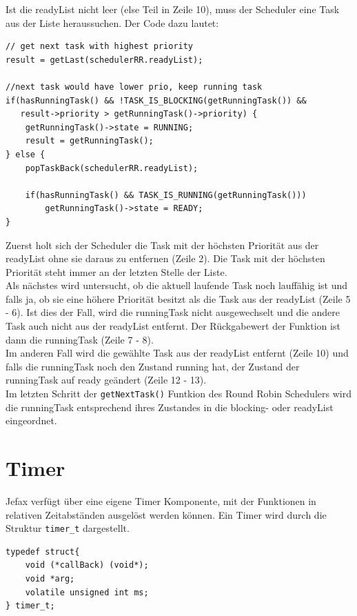 \documentclass[fontsize=12pt, toc=bibliography, notitlepage]{scrreprt}
\begin{document}
Ist die readyList nicht leer (else Teil in Zeile 10), muss der Scheduler eine Task aus der Liste heraussuchen. Der Code dazu lautet:

\begin{lstlisting}[title=schedulerRR.c]
// get next task with highest priority
result = getLast(schedulerRR.readyList);

//next task would have lower prio, keep running task
if(hasRunningTask() && !TASK_IS_BLOCKING(getRunningTask()) &&
   result->priority > getRunningTask()->priority) {
	getRunningTask()->state = RUNNING;
	result = getRunningTask();
} else {
	popTaskBack(schedulerRR.readyList);
	
	if(hasRunningTask() && TASK_IS_RUNNING(getRunningTask()))
		getRunningTask()->state = READY;
}
\end{lstlisting}

Zuerst holt sich der Scheduler die Task mit der höchsten Priorität aus der readyList ohne sie daraus zu entfernen (Zeile 2). Die Task mit der höchsten Priorität steht immer an der letzten Stelle der Liste.\\
Als nächstes wird untersucht, ob die aktuell laufende Task noch lauffähig ist und falls ja, ob sie eine höhere Priorität besitzt als die Task aus der readyList (Zeile 5 - 6). Ist dies der Fall, wird die runningTask nicht ausgewechselt und die andere Task auch nicht aus der readyList entfernt. Der Rückgabewert der Funktion ist dann die runningTask (Zeile 7 - 8).\\
Im anderen Fall wird die gewählte Task aus der readyList entfernt (Zeile 10) und falls die runningTask noch den Zustand running hat, der Zustand der runningTask auf ready geändert (Zeile 12 - 13).\\

Im letzten Schritt der \lstinline$getNextTask()$ Funtkion des Round Robin Schedulers wird die runningTask entsprechend ihres Zustandes in die blocking- oder readyList eingeordnet.\\

\chapter{Timer}
\label{chap:timer}
Jefax verfügt über eine eigene Timer Komponente, mit der Funktionen in relativen Zeitabständen ausgelöst werden können. Ein Timer wird durch die Struktur \lstinline$timer_t$ dargestellt.

\begin{lstlisting}[title=timer.h]
typedef struct{
	void (*callBack) (void*);
	void *arg;
	volatile unsigned int ms;
} timer_t;
\end{lstlisting}
\end{document}
